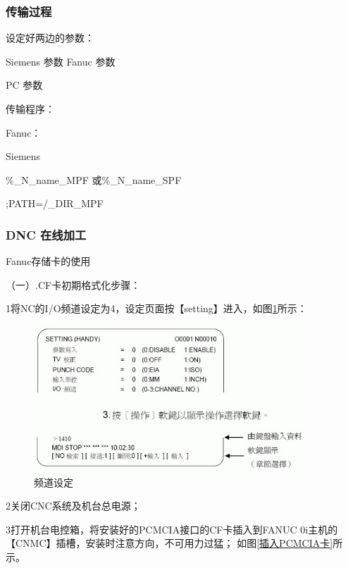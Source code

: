 \subsubsection{传输过程}
设定好两边的参数：

Siemens 参数      Fanuc 参数

PC 参数

传输程序：

Fanuc：

Siemens

\%\_N\_name\_MPF    或\%\_N\_name\_SPF

;PATH=/\_DIR\_MPF

\subsubsection{DNC 在线加工}

Fanuc存储卡的使用

（一）.CF卡初期格式化步骤：

1将NC的I/O频道设定为4，设定页面按【setting】进入，如图\ref{频道设定}所示：

\begin{figure}[!hbtp]
	\centering	\includegraphics[width=0.9\textwidth]{images/14-1}
	\caption{频道设定} \label{频道设定}
\end{figure}

2关闭CNC系统及机台总电源；

3打开机台电控箱，将安装好的PCMCIA接口的CF卡插入到FANUC 0i主机的【CNMC】插槽，安装时注意方向，不可用力过猛；
如图\ref{插入PCMCIA卡}所示。

